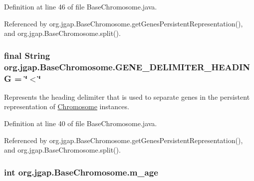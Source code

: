 Definition at line 46 of file Base\-Chromosome.\-java.



Referenced by org.\-jgap.\-Base\-Chromosome.\-get\-Genes\-Persistent\-Representation(), and org.\-jgap.\-Base\-Chromosome.\-split().

\hypertarget{classorg_1_1jgap_1_1_base_chromosome_a52428dfc927129c8960a9d9ca3864346}{
\subsubsection[{G\-E\-N\-E\-\_\-\-D\-E\-L\-I\-M\-I\-T\-E\-R\-\_\-\-H\-E\-A\-D\-I\-N\-G}]{\setlength{\rightskip}{0pt plus 5cm}final String org.\-jgap.\-Base\-Chromosome.\-G\-E\-N\-E\-\_\-\-D\-E\-L\-I\-M\-I\-T\-E\-R\-\_\-\-H\-E\-A\-D\-I\-N\-G = \char`\"{}$<$\char`\"{}\hspace{0.3cm}{\ttfamily [static]}}}\label{classorg_1_1jgap_1_1_base_chromosome_a52428dfc927129c8960a9d9ca3864346}
Represents the heading delimiter that is used to separate genes in the persistent representation of \hyperlink{classorg_1_1jgap_1_1_chromosome}{Chromosome} instances. 

Definition at line 40 of file Base\-Chromosome.\-java.



Referenced by org.\-jgap.\-Base\-Chromosome.\-get\-Genes\-Persistent\-Representation(), and org.\-jgap.\-Base\-Chromosome.\-split().

\hypertarget{classorg_1_1jgap_1_1_base_chromosome_a8208f36f8feb650c1e72edf2244e44f3}{
\subsubsection[{m\-\_\-age}]{\setlength{\rightskip}{0pt plus 5cm}int org.\-jgap.\-Base\-Chromosome.\-m\-\_\-age\hspace{0.3cm}{\ttfamily [private]}}}\label{classorg_1_1jgap_1_1_base_chromosome_a8208f36f8feb650c1e72edf2244e44f3}


